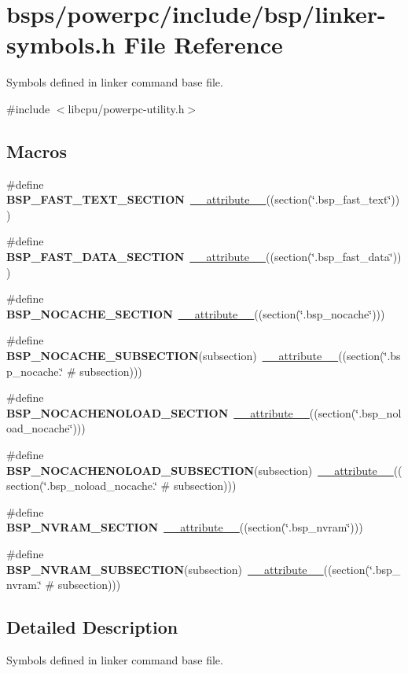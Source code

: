 \hypertarget{powerpc_2include_2bsp_2linker-symbols_8h}{}\section{bsps/powerpc/include/bsp/linker-\/symbols.h File Reference}
\label{powerpc_2include_2bsp_2linker-symbols_8h}


Symbols defined in linker command base file.  


{\ttfamily \#include $<$libcpu/powerpc-\/utility.\+h$>$}\newline
\subsection*{Macros}
\begin{DoxyCompactItemize}
\item 
\#define {\bfseries B\+S\+P\+\_\+\+F\+A\+S\+T\+\_\+\+T\+E\+X\+T\+\_\+\+S\+E\+C\+T\+I\+ON}~\mbox{\hyperlink{struct____attribute____}{\+\_\+\+\_\+attribute\+\_\+\+\_\+}}((section(\char`\"{}.bsp\+\_\+fast\+\_\+text\char`\"{})))
\item 
\#define {\bfseries B\+S\+P\+\_\+\+F\+A\+S\+T\+\_\+\+D\+A\+T\+A\+\_\+\+S\+E\+C\+T\+I\+ON}~\mbox{\hyperlink{struct____attribute____}{\+\_\+\+\_\+attribute\+\_\+\+\_\+}}((section(\char`\"{}.bsp\+\_\+fast\+\_\+data\char`\"{})))
\item 
\#define {\bfseries B\+S\+P\+\_\+\+N\+O\+C\+A\+C\+H\+E\+\_\+\+S\+E\+C\+T\+I\+ON}~\mbox{\hyperlink{struct____attribute____}{\+\_\+\+\_\+attribute\+\_\+\+\_\+}}((section(\char`\"{}.bsp\+\_\+nocache\char`\"{})))
\item 
\#define {\bfseries B\+S\+P\+\_\+\+N\+O\+C\+A\+C\+H\+E\+\_\+\+S\+U\+B\+S\+E\+C\+T\+I\+ON}(subsection)~\mbox{\hyperlink{struct____attribute____}{\+\_\+\+\_\+attribute\+\_\+\+\_\+}}((section(\char`\"{}.bsp\+\_\+nocache.\char`\"{} \# subsection)))
\item 
\#define {\bfseries B\+S\+P\+\_\+\+N\+O\+C\+A\+C\+H\+E\+N\+O\+L\+O\+A\+D\+\_\+\+S\+E\+C\+T\+I\+ON}~\mbox{\hyperlink{struct____attribute____}{\+\_\+\+\_\+attribute\+\_\+\+\_\+}}((section(\char`\"{}.bsp\+\_\+noload\+\_\+nocache\char`\"{})))
\item 
\#define {\bfseries B\+S\+P\+\_\+\+N\+O\+C\+A\+C\+H\+E\+N\+O\+L\+O\+A\+D\+\_\+\+S\+U\+B\+S\+E\+C\+T\+I\+ON}(subsection)~\mbox{\hyperlink{struct____attribute____}{\+\_\+\+\_\+attribute\+\_\+\+\_\+}}((section(\char`\"{}.bsp\+\_\+noload\+\_\+nocache.\char`\"{} \# subsection)))
\item 
\#define {\bfseries B\+S\+P\+\_\+\+N\+V\+R\+A\+M\+\_\+\+S\+E\+C\+T\+I\+ON}~\mbox{\hyperlink{struct____attribute____}{\+\_\+\+\_\+attribute\+\_\+\+\_\+}}((section(\char`\"{}.bsp\+\_\+nvram\char`\"{})))
\item 
\#define {\bfseries B\+S\+P\+\_\+\+N\+V\+R\+A\+M\+\_\+\+S\+U\+B\+S\+E\+C\+T\+I\+ON}(subsection)~\mbox{\hyperlink{struct____attribute____}{\+\_\+\+\_\+attribute\+\_\+\+\_\+}}((section(\char`\"{}.bsp\+\_\+nvram.\char`\"{} \# subsection)))
\end{DoxyCompactItemize}


\subsection{Detailed Description}
Symbols defined in linker command base file. 

